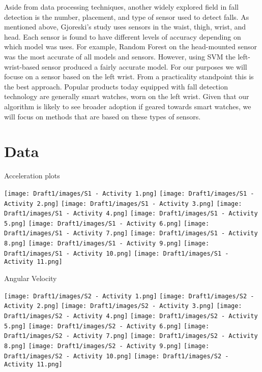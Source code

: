 \documentclass{llncs}
\begin{document}
    Aside from data processing techniques, another widely explored field in fall detection is the number, placement, and type of sensor used to detect falls. As mentioned above, Gjoreski's study uses sensors in the waist, thigh, wrist, and head. Each sensor is found to have different levels of accuracy depending on which model was uses. For example, Random Forest on the head-mounted sensor was the most accurate of all models and sensors. However, using SVM the left-wrist-based sensor produced a fairly accurate model. \cite{gjoreski2016accurately} For our purposes we will focuse on a sensor based on the left wrist. From a practicality standpoint this is the best approach. Popular products today equipped with fall detection technology are generally smart watches, worn on the left wrist. Given that our algorithm is likely to see broader adoption if geared towards smart watches, we will focus on methods that are based on these types of sensors.
     
\section{Data}
    
    Acceleration plots
    
    
    \texttt{[image: Draft1/images/S1 - Activity 1.png]}
    \texttt{[image: Draft1/images/S1 - Activity 2.png]}
    \texttt{[image: Draft1/images/S1 - Activity 3.png]}
    \texttt{[image: Draft1/images/S1 - Activity 4.png]}
    \texttt{[image: Draft1/images/S1 - Activity 5.png]}
    \texttt{[image: Draft1/images/S1 - Activity 6.png]}
    \texttt{[image: Draft1/images/S1 - Activity 7.png]}
    \texttt{[image: Draft1/images/S1 - Activity 8.png]}
    \texttt{[image: Draft1/images/S1 - Activity 9.png]}
    \texttt{[image: Draft1/images/S1 - Activity 10.png]}
    \texttt{[image: Draft1/images/S1 - Activity 11.png]}
    
    
    Angular Velocity
    
    
    \texttt{[image: Draft1/images/S2 - Activity 1.png]}
    \texttt{[image: Draft1/images/S2 - Activity 2.png]}
    \texttt{[image: Draft1/images/S2 - Activity 3.png]}
    \texttt{[image: Draft1/images/S2 - Activity 4.png]}
    \texttt{[image: Draft1/images/S2 - Activity 5.png]}
    \texttt{[image: Draft1/images/S2 - Activity 6.png]}
    \texttt{[image: Draft1/images/S2 - Activity 7.png]}
    \texttt{[image: Draft1/images/S2 - Activity 8.png]}
    \texttt{[image: Draft1/images/S2 - Activity 9.png]}
    \texttt{[image: Draft1/images/S2 - Activity 10.png]}
    \texttt{[image: Draft1/images/S2 - Activity 11.png]}
    
\end{document}
